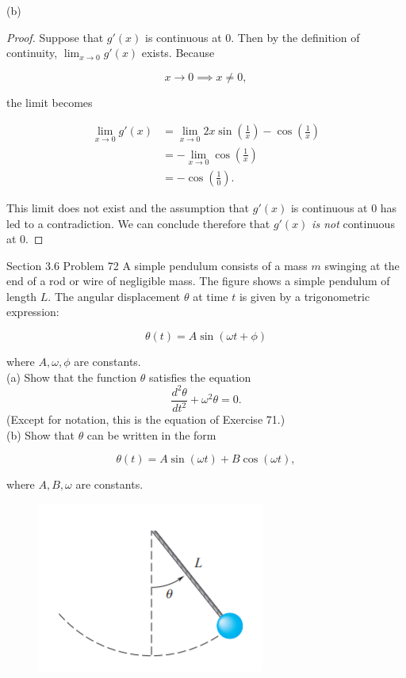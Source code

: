 \documentclass{article}
\begin{document}
    (b)
    \begin{proof}
        Suppose that $g'(x)$ is continuous at 0. Then by the definition of continuity, $\lim_{x\to 0} g'(x)$ exists. Because

        \[
            x\to 0 \implies x\not = 0,
        \]

        the limit becomes

        \begin{align*}
            \lim_{x\to 0} g'(x) &= \lim_{x\to 0} 2x\sin{\left(\frac{1}{x}\right)} - \cos{\left(\frac{1}{x}\right)} \\
            &= -\lim_{x\to 0} \cos{\left(\frac{1}{x}\right)} \\
            &= -\cos{\left(\frac{1}{0}\right)}.
        \end{align*}

        This limit does not exist and the assumption that $g'(x)$ is continuous at 0 has led to a contradiction. We can conclude therefore that $g'(x)$ \textit{is not} continuous at 0.
    \end{proof}




    \begin{tbhtheorem}{Section 3.6 Problem 72}
        A simple pendulum consists of a mass $m$ swinging at the end of a rod or wire of negligible mass. The figure shows a simple pendulum of length $L$. The angular displacement $\theta$ at time $t$ is given by a
        trigonometric expression:

        \[
            \theta (t) = A\sin{(\omega t + \phi)}
        \]

        where $A, \omega, \phi$ are constants. \\
        (a) Show that the function $\theta$ satisfies the equation
        \[
            \frac{d^2 \theta}{dt^2} + \omega ^2 \theta = 0.
        \]
        (Except for notation, this is the equation of Exercise 71.) \\
        (b) Show that $\theta$ can be written in the form

        \[
            \theta (t) = A\sin{(\omega t)} + B\cos{(\omega t)},
        \]

        where $A,B,\omega$ are constants.
    \end{tbhtheorem}

    \begin{figure}[hbt!]
        \centering
        \includegraphics[]{Homework3_Fig2}
    \end{figure}
\end{document}
